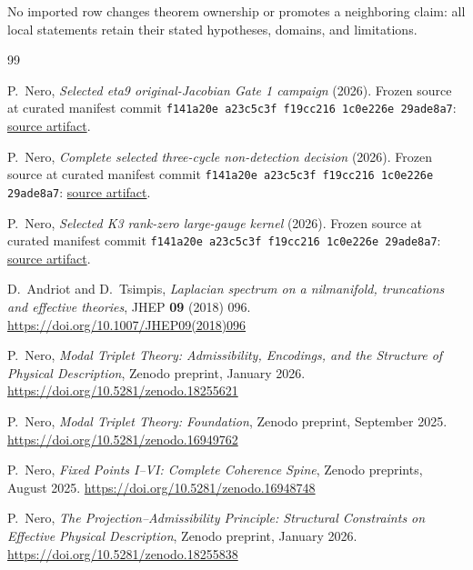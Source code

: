 \documentclass[11pt]{article}
\begin{document}
No imported row changes theorem ownership or promotes a neighboring claim: all local statements retain their stated hypotheses, domains, and limitations.

\begin{thebibliography}{99}

P.~Nero, \emph{Selected eta9 original-Jacobian Gate 1 campaign} (2026).
Frozen source at curated manifest commit
\texttt{f141a20e a23c5c3f f19cc216 1c0e226e 29ade8a7}:
\href{https://github.com/PeterNero/mtt-results-repro/blob/f141a20ea23c5c3ff19cc2161c0e226e29ade8a7/release/results/eta9_gate1_campaign/artifact.json}{source artifact}.

P.~Nero, \emph{Complete selected three-cycle non-detection decision} (2026).
Frozen source at curated manifest commit
\texttt{f141a20e a23c5c3f f19cc216 1c0e226e 29ade8a7}:
\href{https://github.com/PeterNero/mtt-results-repro/blob/f141a20ea23c5c3ff19cc2161c0e226e29ade8a7/release/results/eta9_three_cycle_b96_nondetection/artifact.json}{source artifact}.

P.~Nero, \emph{Selected K3 rank-zero large-gauge kernel} (2026).
Frozen source at curated manifest commit
\texttt{f141a20e a23c5c3f f19cc216 1c0e226e 29ade8a7}:
\href{https://github.com/PeterNero/mtt-results-repro/blob/f141a20ea23c5c3ff19cc2161c0e226e29ade8a7/release/results/q79_bk3_rank_zero_kernel/artifact.json}{source artifact}.

D.~Andriot and D.~Tsimpis,
\emph{Laplacian spectrum on a nilmanifold, truncations and effective theories},
JHEP \textbf{09} (2018) 096.
\url{https://doi.org/10.1007/JHEP09(2018)096}

P.~Nero,
\emph{Modal Triplet Theory: Admissibility, Encodings, and the Structure of Physical Description},
Zenodo preprint, January 2026.
\url{https://doi.org/10.5281/zenodo.18255621}

P.~Nero,
\emph{Modal Triplet Theory: Foundation},
Zenodo preprint, September 2025.
\url{https://doi.org/10.5281/zenodo.16949762}

P.~Nero,
\emph{Fixed Points I--VI: Complete Coherence Spine},
Zenodo preprints, August 2025.
\url{https://doi.org/10.5281/zenodo.16948748}

P.~Nero,
\emph{The Projection--Admissibility Principle: Structural Constraints on Effective Physical Description},
Zenodo preprint, January 2026.
\url{https://doi.org/10.5281/zenodo.18255838}


\end{thebibliography}
\end{document}
